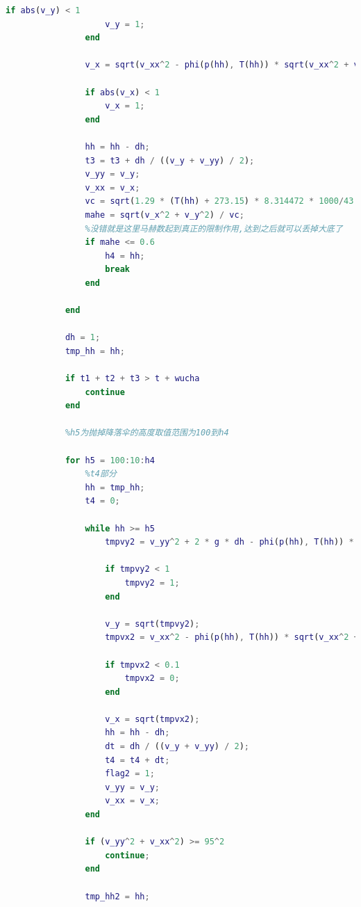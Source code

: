 \documentclass[hyperref,a4paper,UTF8]{ctexart}
\begin{document}
\begin{lstlisting}[language=Matlab]
                if abs(v_y) < 1
                    v_y = 1;
                end

                v_x = sqrt(v_xx^2 - phi(p(hh), T(hh)) * sqrt(v_xx^2 + v_yy^2) * (S_floor + S_para) * dh * v_xx^2 / (m * v_yy));

                if abs(v_x) < 1
                    v_x = 1;
                end

                hh = hh - dh;
                t3 = t3 + dh / ((v_y + v_yy) / 2);
                v_yy = v_y;
                v_xx = v_x;
                vc = sqrt(1.29 * (T(hh) + 273.15) * 8.314472 * 1000/43.34);
                mahe = sqrt(v_x^2 + v_y^2) / vc;
                %没错就是这里马赫数起到真正的限制作用,达到之后就可以丢掉大底了
                if mahe <= 0.6
                    h4 = hh;
                    break
                end

            end

            dh = 1;
            tmp_hh = hh;

            if t1 + t2 + t3 > t + wucha
                continue
            end

            %h5为抛掉降落伞的高度取值范围为100到h4

            for h5 = 100:10:h4
                %t4部分
                hh = tmp_hh;
                t4 = 0;

                while hh >= h5
                    tmpvy2 = v_yy^2 + 2 * g * dh - phi(p(hh), T(hh)) * sqrt(v_yy^2 + v_xx^2) * (S_floor + S_para) * dh * v_yy / (m - m_floor);

                    if tmpvy2 < 1
                        tmpvy2 = 1;
                    end

                    v_y = sqrt(tmpvy2);
                    tmpvx2 = v_xx^2 - phi(p(hh), T(hh)) * sqrt(v_xx^2 + v_yy^2) * (S_floor + S_para) * dh * v_xx^2 / ((m - m_floor) * v_yy);

                    if tmpvx2 < 0.1
                        tmpvx2 = 0;
                    end

                    v_x = sqrt(tmpvx2);
                    hh = hh - dh;
                    dt = dh / ((v_y + v_yy) / 2);
                    t4 = t4 + dt;
                    flag2 = 1;
                    v_yy = v_y;
                    v_xx = v_x;
                end

                if (v_yy^2 + v_xx^2) >= 95^2
                    continue;
                end

                tmp_hh2 = hh;


\end{lstlisting}
\end{document}
